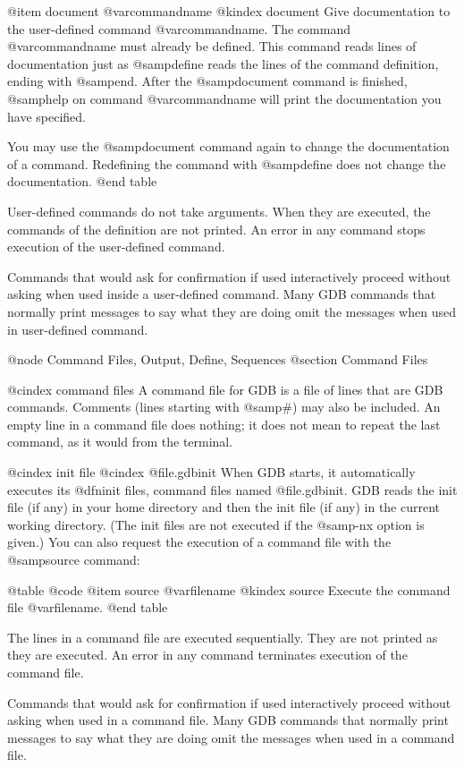 @item document @var{commandname}
@kindex document
Give documentation to the user-defined command @var{commandname}.  The
command @var{commandname} must already be defined.  This command reads
lines of documentation just as @samp{define} reads the lines of the
command definition, ending with @samp{end}.  After the @samp{document}
command is finished, @samp{help} on command @var{commandname} will print
the documentation you have specified.

You may use the @samp{document} command again to change the
documentation of a command.  Redefining the command with @samp{define}
does not change the documentation.
@end table

User-defined commands do not take arguments.  When they are executed, the
commands of the definition are not printed.  An error in any command
stops execution of the user-defined command.

Commands that would ask for confirmation if used interactively proceed
without asking when used inside a user-defined command.  Many GDB commands
that normally print messages to say what they are doing omit the messages
when used in user-defined command.

@node Command Files, Output, Define, Sequences
@section Command Files

@cindex command files
A command file for GDB is a file of lines that are GDB commands.  Comments
(lines starting with @samp{#}) may also be included.  An empty line in a
command file does nothing; it does not mean to repeat the last command, as
it would from the terminal.

@cindex init file
@cindex @file{.gdbinit}
When GDB starts, it automatically executes its @dfn{init files}, command
files named @file{.gdbinit}.  GDB reads the init file (if any) in your home
directory and then the init file (if any) in the current working
directory.  (The init files are not executed if the @samp{-nx} option
is given.)  You can also request the execution of a command file with the
@samp{source} command:

@table @code
@item source @var{filename}
@kindex source
Execute the command file @var{filename}.
@end table

The lines in a command file are executed sequentially.  They are not
printed as they are executed.  An error in any command terminates execution
of the command file.

Commands that would ask for confirmation if used interactively proceed
without asking when used in a command file.  Many GDB commands that
normally print messages to say what they are doing omit the messages
when used in a command file.

